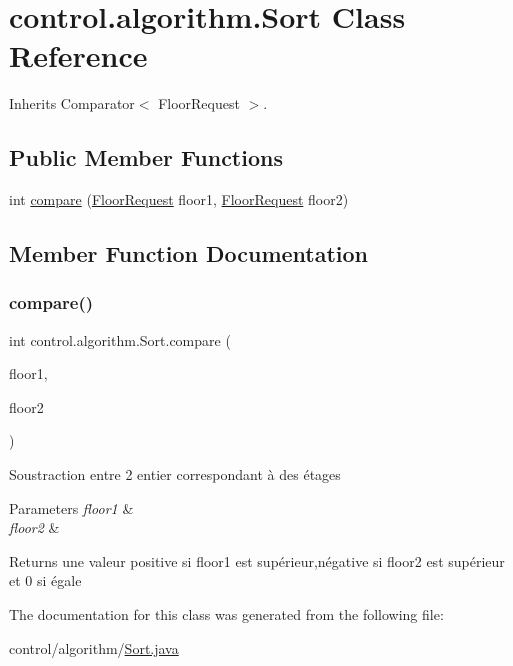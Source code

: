 \hypertarget{classcontrol_1_1algorithm_1_1_sort}{}\section{control.\+algorithm.\+Sort Class Reference}
\label{classcontrol_1_1algorithm_1_1_sort}


Inherits Comparator$<$ Floor\+Request $>$.

\subsection*{Public Member Functions}
\begin{DoxyCompactItemize}
\item 
int \mbox{\hyperlink{classcontrol_1_1algorithm_1_1_sort_a7b8bfc4d73475992e728addc4cc7c9a4}{compare}} (\mbox{\hyperlink{classcontrol_1_1command_1_1_floor_request}{Floor\+Request}} floor1, \mbox{\hyperlink{classcontrol_1_1command_1_1_floor_request}{Floor\+Request}} floor2)
\end{DoxyCompactItemize}


\subsection{Member Function Documentation}
\mbox{\label{classcontrol_1_1algorithm_1_1_sort_a7b8bfc4d73475992e728addc4cc7c9a4}} 
\subsubsection{\texorpdfstring{compare()}{compare()}}
{\footnotesize\ttfamily int control.\+algorithm.\+Sort.\+compare (\begin{DoxyParamCaption}\item[{\mbox{\hyperlink{classcontrol_1_1command_1_1_floor_request}{Floor\+Request}}}]{floor1,  }\item[{\mbox{\hyperlink{classcontrol_1_1command_1_1_floor_request}{Floor\+Request}}}]{floor2 }\end{DoxyParamCaption})}

Soustraction entre 2 entier correspondant à des étages 
\begin{DoxyParams}{Parameters}
{\em floor1} & \\
\hline
{\em floor2} & \\
\hline
\end{DoxyParams}
\begin{DoxyReturn}{Returns}
une valeur positive si floor1 est supérieur,négative si floor2 est supérieur et 0 si égale 
\end{DoxyReturn}


The documentation for this class was generated from the following file\+:\begin{DoxyCompactItemize}
\item 
control/algorithm/\mbox{\hyperlink{_sort_8java}{Sort.\+java}}\end{DoxyCompactItemize}
